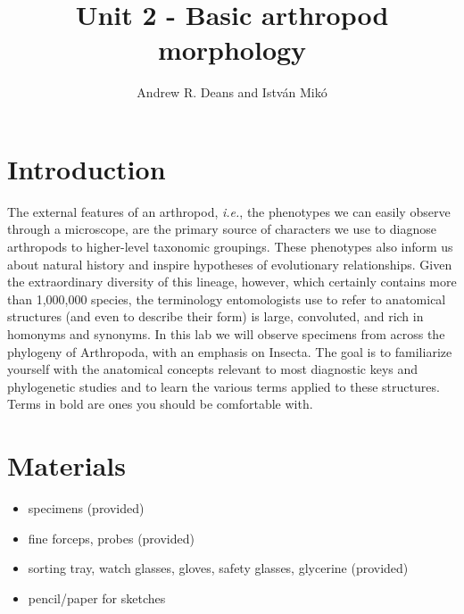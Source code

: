 \documentclass[letterpaper, 11pt]{article}
\title{Unit 2 - Basic arthropod morphology}
\author{Andrew R. Deans and Istv\'an Mik\'o}
\begin{document}
\cleanlookdateon %
\maketitle
\thispagestyle{fancy}
\section*{Introduction}
The external features of an arthropod, \textit{i.e.}, the phenotypes we can easily observe through a microscope, are the primary source of characters we use to diagnose arthropods to higher-level taxonomic groupings. These phenotypes also inform us about natural history and inspire hypotheses of evolutionary relationships. Given the extraordinary diversity of this lineage, however, which certainly contains more than 1,000,000 species, the terminology entomologists use to refer to anatomical structures (and even to describe their form) is large, convoluted, and rich in homonyms and synonyms. In this lab we will observe specimens from across the phylogeny of Arthropoda, with an emphasis on Insecta. The goal is to familiarize yourself with the anatomical concepts relevant to most diagnostic keys and phylogenetic studies and to learn the various terms applied to these structures. Terms in bold are ones you should be comfortable with.

\section*{Materials}
\begin{itemize}
	\item {specimens (provided)}
	\item {fine forceps, probes (provided)}
	\item {sorting tray, watch glasses, gloves, safety glasses, glycerine (provided)}
	\item {pencil/paper for sketches}
\end{itemize}
\end{document}
